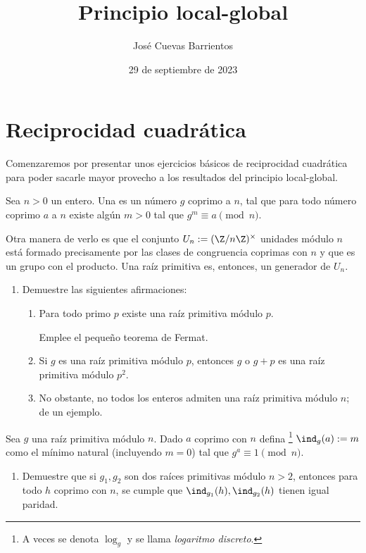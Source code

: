 \documentclass[11pt, reqno]{amsart}
\title{Principio local-global}
\date{29 de septiembre de 2023}
\author[José Cuevas]{José Cuevas Barrientos}
\begin{document}
\maketitle

\section{Reciprocidad cuadrática}
Comenzaremos por presentar unos ejercicios básicos de reciprocidad cuadrática para poder sacarle mayor provecho a los resultados del principio local-global.
\begin{mydef}
	Sea $n > 0$ un entero.
	Una  es un número $g$ coprimo a $n$,
	tal que para todo número coprimo $a$ a $n$ existe algún $m > 0$ tal que $g^m \equiv a \pmod n$.
\end{mydef}
Otra manera de verlo es que el conjunto $U_n := (\Z/n\Z)^\times$ unidades módulo $n$ está formado precisamente por las clases de congruencia coprimas con $n$
y que es un grupo con el producto.
Una raíz primitiva es, entonces, un generador de $U_n$.

\begin{enumerate}
	\item Demuestre las siguientes afirmaciones:
		\begin{enumerate}
			\item Para todo primo $p$ existe una raíz primitiva módulo $p$.
				\begin{hint}
					Emplee el pequeño teorema de Fermat.
				\end{hint}
			\item Si $g$ es una raíz primitiva módulo $p$, entonces $g$ o $g + p$ es una raíz primitiva módulo $p^2$.
			\item No obstante, no todos los enteros admiten una raíz primitiva módulo $n$; de un ejemplo.
		\end{enumerate}
\end{enumerate}

\begin{mydef}
	Sea $g$ una raíz primitiva módulo $n$.
	Dado $a$ coprimo con $n$ defina%
	\footnote{A veces se denota $\log_g$ y se llama \textit{logaritmo discreto}.}
	$\ind_g(a) := m$ como el mínimo natural (incluyendo $m = 0$) tal que $g^a \equiv 1 \pmod n$.
\end{mydef}
\begin{enumerate}[resume]
	\item Demuestre que si $g_1, g_2$ son dos raíces primitivas módulo $n > 2$,
		entonces para todo $h$ coprimo con $n$, se cumple que $\ind_{g_1}(h), \ind_{g_2}(h)$ tienen igual paridad.
\end{enumerate}
\end{document}
